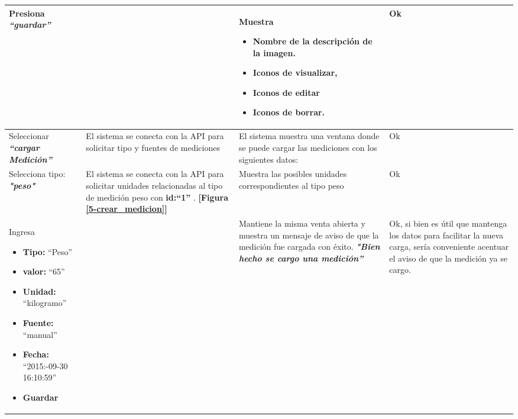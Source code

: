 \begin{longtable}{|m{3.5cm}|m{3.5cm}|m{3.5cm}|m{2.5cm}|}
 

Presiona \textbf{\textit{``guardar''}}
&
& Muestra
\begin{itemize}
	\item Nombre de la descripción de la imagen.
	\item Iconos de visualizar,
	\item \textbf{Iconos de editar}
	\item \textbf{Iconos de borrar.}
\end{itemize}
& Ok
\\ \hline





Seleccionar \textit{\textbf{``cargar Medición'' }}
& El sistema se conecta con la API para solicitar tipo y fuentes de mediciones
& El sistema muestra una ventana donde  se puede cargar las mediciones con los siguientes datos:
\textbf{\begin{itemize}
	\item ``Tipo'',
\item ``Valor''
\item ``Unidad''
\item ``Fuente''
\item ``Fecha''
\end{itemize}}
\textbf{[Figura \ref{5-cargar_medicion}]}
& Ok
\\ \hline




Selecciona tipo:\textit{\textbf{ "peso"} }
	& El sistema se conecta con la API para
solicitar unidades relacionadas al tipo de medición peso con \textbf{id:``1'' }. \textbf{[Figura \ref{5-crear_medicion}]}
& Muestra las posibles unidades correspondientes al tipo peso
& Ok
\\ \hline



Ingresa
\begin{itemize}
	\item \textbf{Tipo:} ``Peso''
	\item \textbf{valor: }``65''
	\item \textbf{Unidad:} ``kilogramo''
	\item \textbf{Fuente: }``manual''
	\item \textbf{Fecha: }``2015:-09-30 16:10:59''
	\item \textbf{ Guardar}
\end{itemize}
&
& Mantiene la misma venta abierta y muestra un mensaje de aviso de que la
medición fue cargada con éxito.\textit{ \textbf{"Bien hecho se cargo una medición''}}
& Ok, si bien es útil que mantenga los datos para facilitar la nueva carga, sería conveniente acentuar el aviso de que la medición ya se cargo.
\\ \hline






\end{longtable}
